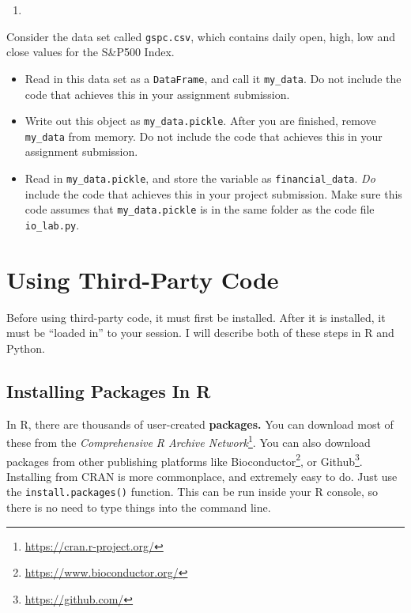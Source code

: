 \documentclass[
  12pt,
  krantz2]{krantz}
\providecommand{\tightlist}{%
  \setlength{\itemsep}{0pt}\setlength{\parskip}{0pt}}
\renewcommand{\href}[2]{#2\footnote{\url{#1}}}
\begin{document}
\begin{enumerate}
\def\labelenumi{\arabic{enumi}.}
\setcounter{enumi}{1}
\tightlist
\item
\end{enumerate}

Consider the data set called \texttt{gspc.csv}, which contains daily open, high, low and close values for the S\&P500 Index.

\begin{itemize}
\tightlist
\item
  Read in this data set as a \texttt{DataFrame}, and call it \texttt{my\_data}. Do not include the code that achieves this in your assignment submission.
\item
  Write out this object as \texttt{my\_data.pickle}. After you are finished, remove \texttt{my\_data} from memory. Do not include the code that achieves this in your assignment submission.
\item
  Read in \texttt{my\_data.pickle}, and store the variable as \texttt{financial\_data}. \emph{Do} include the code that achieves this in your project submission. Make sure this code assumes that \texttt{my\_data.pickle} is in the same folder as the code file \texttt{io\_lab.py}.
\end{itemize}

\hypertarget{using-third-party-code}{%
\chapter{Using Third-Party Code}\label{using-third-party-code}}

Before using third-party code, it must first be installed. After it is installed, it must be ``loaded in'' to your session. I will describe both of these steps in R and Python.

\hypertarget{installing-packages-in-r}{%
\section{Installing Packages In R}\label{installing-packages-in-r}}

In R, there are thousands of user-created \textbf{packages.} You can download most of these from the \href{https://cran.r-project.org/}{\emph{Comprehensive R Archive Network}}. You can also download packages from other publishing platforms like \href{https://www.bioconductor.org/}{Bioconductor}, or \href{https://github.com/}{Github}. Installing from CRAN is more commonplace, and extremely easy to do. Just use the \texttt{install.packages()} function. This can be run inside your R console, so there is no need to type things into the command line.
\end{document}
